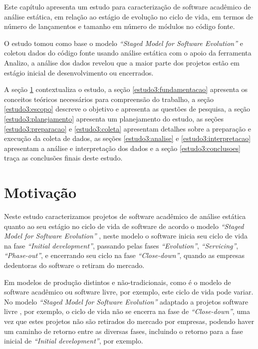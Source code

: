 \label{estudo3}

Este capítulo apresenta
um estudo para caracterização de software acadêmico de análise estática,
em relação ao estágio de evolução no ciclo de vida,
em termos de número de lançamentos e
tamanho em número de módulos no código fonte.

O estudo tomou como base o modelo {\it ``Staged Model for Software Evolution''}
e coletou dados do código fonte usando análise estática com o apoio da
ferramenta Analizo, a análise dos dados revelou que a maior parte dos projetos
estão em estágio inicial de desenvolvimento ou encerrados.

A seção \ref{estudo3:introducao} contextualiza o estudo,
a seção \ref{estudo3:fundamentacao} apresenta os conceitos teóricos necessários para compreensão do trabalho,
a seção \ref{estudo3:escopo} descreve o objetivo e apresenta as questões de pesquisa,
a seção \ref{estudo3:planejamento} apresenta um planejamento do estudo,
as seções \ref{estudo3:preparacao} e \ref{estudo3:coleta} apresentam detalhes sobre a preparação e execução da coleta de dados,
as seções \ref{estudo3:analise} e \ref{estudo3:interpretacao} apresentam a análise e interpretação dos dados e
a seção \ref{estudo3:conclusoes} traça as conclusões finais deste estudo.

\section{Motivação} \label{estudo3:introducao}

Neste estudo caracterizamos projetos de software acadêmico de análise
estática quanto ao seu estágio no ciclo de vida de software de acordo o modelo
{\it ``Staged Model for Software Evolution''}
\cite{rajlich2000staged}, neste modelo o software inicia seu ciclo de
vida na fase {\it ``Initial development''}, passando pelas fases {\it
``Evolution''}, {\it ``Servicing''}, {\it ``Phase-out''}, e encerrando seu ciclo
na fase {\it ``Close-down''}, quando as empresas dedentoras do
software o retiram do mercado.

Em modelos de produção distintos e não-tradicionais, como é o modelo de
software acadêmico ou software livre, por exemplo, este ciclo de vida pode
variar. No modelo {\it ``Staged Model for Software Evolution''} adaptado a
projetos software livre \cite{capiluppi2007adapting}, por exemplo, o ciclo de
vida não se encerra na fase de {\it ``Close-down''}, uma vez que estes projetos
não são retirados do mercado por empresas, podendo haver um caminho de retorno
entre as diversas fases, incluindo o retorno para a fase inicial de {\it
``Initial development''}, por exemplo.

